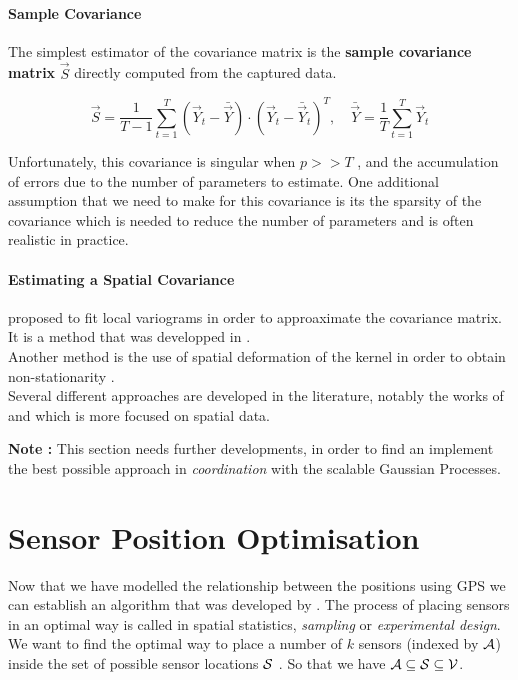 \paragraph{Sample Covariance}

The simplest estimator of the covariance matrix is the \textbf{sample covariance matrix} $\vec{S}$ directly computed from the captured data. 

\begin{equation}
    \vec{S} = \frac{1}{T -1} \sum_{t=1}^T (\vec{Y}_t - \bar{\vec{Y}})\cdot (\vec{Y}_t - \bar{\vec{Y}}_t)^T, \quad \bar{\vec{Y}} = \frac{1}{T} \sum_{t=1}^T \vec{Y}_t
\end{equation}

Unfortunately, this covariance is singular when $p >> T$ \citep{fan_overview_2015}, and the accumulation of errors due to the number of parameters to estimate. One additional assumption that we need to make for this covariance is its the sparsity of the covariance which is needed to reduce the number of parameters and is often realistic in practice. 

\paragraph{Estimating a Spatial Covariance} 

\cite{nott_estimation_2002-1} proposed to fit local variograms in order to approaximate the covariance matrix. It is a method that was developped in \cite{cressie_statistics_1991}. \\

Another method is the use of spatial deformation of the kernel in order to obtain non-stationarity \citep{sampson_nonparametric_1992}. \\

Several different approaches are developed in the literature, notably the works of \citep{fan_overview_2015} and \cite{guttorp_20_1994} which is more focused on spatial data. 

\textbf{Note :} This section needs further developments, in order to find an implement the best possible approach in \textit{coordination} with the scalable Gaussian Processes. 

\section{Sensor Position Optimisation}

Now that we have modelled the relationship between the positions using GPS we can establish an algorithm that was developed by \citet{krause_near-optimal_2008}. The process of placing sensors in an optimal way is called in spatial statistics, \textit{sampling} or \textit{experimental design}. We want to find the optimal way to place a number of $k$ sensors (indexed by $\A$) inside the set of possible sensor locations $\S$ . So that we have $\A \subseteq \S \subseteq \V$. \\


